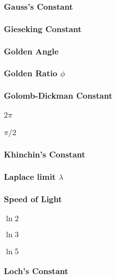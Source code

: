 \documentclass[10pt,a4paper]{report}
\begin{document}
			\subsubsection{Gauss's Constant}
			\subsubsection{Gieseking Constant}
			\subsubsection{Golden Angle}
			\subsubsection{Golden Ratio $\phi$}
			\subsubsection{Golomb-Dickman Constant}
			\subsubsection{$2\pi$}
			\subsubsection{$\pi / 2$}
			\subsubsection{Khinchin's Constant}
			\subsubsection{Laplace limit $\lambda$}
			\subsubsection{Speed of Light}
			\subsubsection{$\ln 2$}
			\subsubsection{$\ln 3$}
			\subsubsection{$\ln 5$}
			\subsubsection{Loch's Constant}
\end{document}
